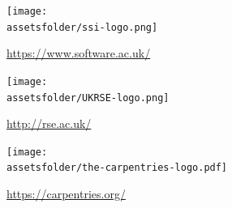 \documentclass{beamer}
\newcommand{\assetsfolder}{./assets}
\begin{document}
	\begin{frame}
	   \begin{center}
		   \texttt{[image: \\assetsfolder/ssi-logo.png]}

			\url{https://www.software.ac.uk/}
	   \end{center}



	\end{frame}

	\begin{frame}
	   \begin{center}
		   \texttt{[image: \\assetsfolder/UKRSE-logo.png]}

			\url{http://rse.ac.uk/}
	   \end{center}

    \end{frame}

	\begin{frame}
	   \begin{center}
		   \texttt{[image: \\assetsfolder/the-carpentries-logo.pdf]}

			\url{https://carpentries.org/}
	   \end{center}

	\end{frame}
\end{document}
